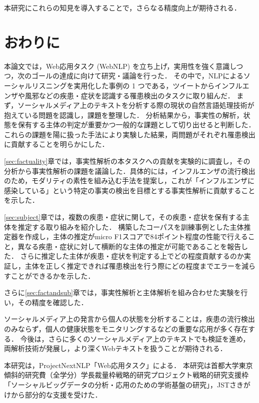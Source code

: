 \documentclass[japanese]{jnlp_1.4}
\begin{document}
本研究にこれらの知見を導入することで，さらなる精度向上が期待される．
 



\section{おわりに}
\label{sec:conclusion}

本論文では，Web応用タスク (WebNLP) を立ち上げ，実用性を強く意識しつつ，次のゴールの達成に向けて研究・議論を行った．
その中で，NLPによるソーシャルリスニングを実用化した事例の 1 つである，ツイートからインフルエンザや風邪などの疾患・症状を認識する罹患検出のタスクに取り組んだ．
まず，ソーシャルメディア上のテキストを分析する際の現状の自然言語処理技術が抱えている問題を認識し，課題を整理した．
分析結果から，事実性の解析，状態を保有する主体の判定が重要かつ一般的な課題として切り出せると判断した．
これらの課題を陽に扱った手法により実験した結果，両問題がそれぞれ罹患検出に貢献することを明らかにした．

\ref{sec:factuality}章では，事実性解析の本タスクへの貢献を実験的に調査し，その分析から事実性解析の課題を議論した．具体的には，インフルエンザの流行検出のため，モダリティの素性を組み込む手法を提案し，これが「インフルエンザに感染している」という特定の事実の検出を目標とする事実性解析に貢献することを示した．

\ref{sec:subject}章では，複数の疾患・症状に関して，その疾患・症状を保有する主体を推定する取り組みを紹介した．
構築したコーパスを訓練事例とした主体推定器を作成し，主体の推定がmicro F1スコアで84ポイント程度の性能で行えること，異なる疾患・症状に対して横断的な主体の推定が可能であることを報告した．
さらに推定した主体が疾患・症状を判定する上でどの程度貢献するのか実証し，主体を正しく推定できれば罹患検出を行う際にどの程度までエラーを減らすことができるかを示した．

さらに\ref{sec:factandsub}章では，事実性解析と主体解析を組み合わせた実験を行い，その精度を確認した．

ソーシャルメディア上の発言から個人の状態を分析することは，疾患の流行検出のみならず，個人の健康状態をモニタリングするなどの重要な応用が多く存在する．
今後は，さらに多くのソーシャルメディア上のテキストでも検証を進め，両解析技術が発展し，より深くWebテキストを扱うことが期待される．



\acknowledgment

本研究は，ProjectNextNLP「Web応用タスク」による．
本研究は首都大学東京傾斜的研究費（全学分）学長裁量枠戦略的研究プロジェクト戦略的研究支援枠「ソーシャルビッグデータの分析・応用のための学術基盤の研究」，JSTさきがけから部分的な支援を受けた．
\end{document}
